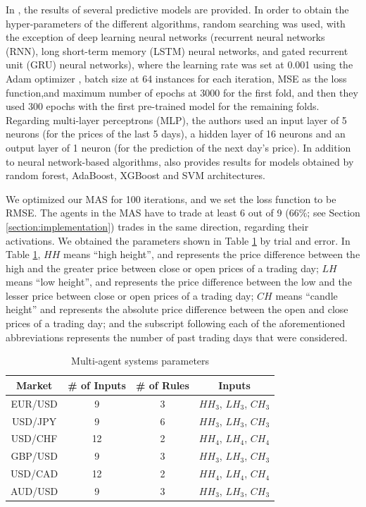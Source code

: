 ﻿\documentclass{ieeeaccess}
\begin{document}
In \cite{Munkhdalai2019}, the results of several predictive models are
provided. In order to obtain the hyper-parameters of the different
algorithms, random searching was used, with the exception of deep
learning neural networks (recurrent neural networks (RNN), long
short-term memory (LSTM) neural networks, and gated recurrent unit
(GRU) neural networks), where the learning rate was set at 0.001 using
the Adam optimizer \cite{kingma2014adam}, batch size at 64 instances
for each iteration, MSE as the loss function,and maximum number of
epochs at 3000 for the first fold, and then they used 300 epochs with
the first pre-trained model for the remaining folds. Regarding
multi-layer perceptrons (MLP), the authors used an input layer of 5 neurons
(for the prices of the last 5 days), a hidden layer of 16 neurons and
an output layer of 1 neuron (for the prediction of the next day's
price). In addition to neural network-based algorithms,
\cite{kingma2014adam} also provides results for models obtained by
random forest, AdaBoost, XGBoost and SVM
architectures.

We optimized our MAS for 100 iterations, and we set the loss
function to be RMSE. The agents in the MAS
have to trade at least 6 out of 9 (66\%; see Section
\ref{section:implementation}) trades in the same direction, regarding
their activations. We obtained the parameters shown in Table
\ref{agents-parameters} by trial and error. In Table
\ref{agents-parameters}, $HH$ means ``high height'', and represents
the price difference between the high and the greater price between
close or open prices of a trading day; $LH$ means ``low height'', and
represents the price difference between the low and the lesser price
between close or open prices of a trading day; $CH$ means ``candle
height'' and represents the absolute price difference between the open
and close prices of a trading day; and the subscript following each of
the aforementioned abbreviations represents the number of past trading
days that were considered.


\begin{table}[]
  \caption{Multi-agent systems parameters}
  \small
  \centering
  \begin{tabular}{cccc}
    \textbf{Market} & \textbf{\# of Inputs} & \textbf{\# of Rules} & \textbf{Inputs} \\
    \hline
    EUR/USD & 9 & 3 & $HH_3$, $LH_3$, $CH_3$ \\
    USD/JPY & 9 & 6 & $HH_3$, $LH_3$, $CH_3$ \\
    USD/CHF & 12 & 2 & $HH_4$, $LH_4$, $CH_4$ \\
    GBP/USD & 9 & 3 & $HH_3$, $LH_3$, $CH_3$ \\
    USD/CAD & 12 & 2 & $HH_4$, $LH_4$, $CH_4$ \\
    AUD/USD & 9 & 3 & $HH_3$, $LH_3$, $CH_3$ \\
  \end{tabular}
  \label{agents-parameters}
\end{table}
\end{document}
